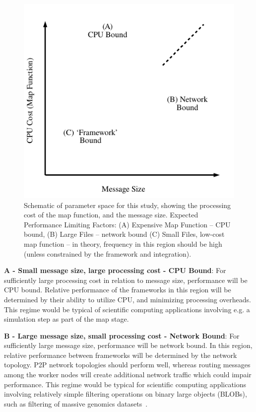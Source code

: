 \documentclass[conference]{IEEEtran}
\begin{document}
\begin{figure}[h]
\begin{center}
\includegraphics[width=0.5\linewidth]{images/prediction}
\end{center}
\caption{Schematic of parameter space for this study, showing the processing cost of the map function, and the message size. Expected Performance Limiting Factors: (A) Expensive Map Function -- CPU bound, (B) Large Files -- network bound (C) Small Files, low-cost map function -- in theory, frequency in this region should be high (unless constrained by the framework and integration).}
\label{fig:prediction}
\end{figure}



\textbf{A - Small message size, large processing cost - CPU Bound}: For sufficiently large processing cost in relation to message size, performance will be CPU bound. Relative performance of the frameworks in this region will be determined by their ability to utilize CPU, and minimizing processing overheads. This regime would be typical of scientific computing applications involving e.g. a simulation step as part of the map stage.

\textbf{B - Large message size, small processing cost - Network Bound}: For sufficiently large message size, performance will be network bound. In this region, relative performance between frameworks will be determined by the network topology. P2P network topologies should perform well, whereas routing messages among the worker nodes will create additional network traffic which could impair performance. This regime would be typical for scientific computing applications involving relatively simple filtering operations on binary large objects (BLOBs), such as filtering of massive genomics datasets~\cite{ausmeesBAMSIMulticloudService2018}.
\end{document}
